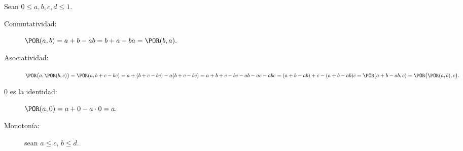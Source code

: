 
Sean \(0 ≤ a, b, c, d ≤ 1\).
\begin{description}
  \item[Conmutatividad:]
    \(
      \POR(a, b) =
      a + b - ab =
      b + a - ba =
      \POR(b, a).
    \)
  \item[Asociatividad:]
    \(
      \POR\bigl(a, \POR(b, c)\bigr) =
      \POR(a, b + c - bc) =
      a + (b + c - bc) - a(b + c - bc) =
      a + b + c - bc - ab - ac - abc =
      (a + b - ab) + c - (a + b - ab)c =
      \POR(a + b - ab, c) =
      \POR\bigl(\POR(a, b), c\bigr).
    \)
  \item[0 es la identidad:]
    \(
      \POR(a, 0) = a + 0 - a\cdot 0 = a.
    \)
  \item[Monotonía:] sean \(a ≤ c\), \(b ≤ d\).
\end{description}

\saltito



